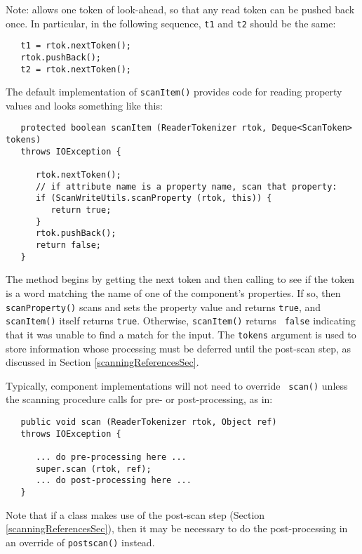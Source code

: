 \documentclass{article}
\begin{document}
\begin{sideblock}
Note:  allows one
token of look-ahead, so that any read token can be pushed
back once. In particular, in the following sequence,
{\tt t1} and {\tt t2} should be the same:
\begin{verbatim}
   t1 = rtok.nextToken();
   rtok.pushBack();
   t2 = rtok.nextToken();
\end{verbatim}
\end{sideblock}

The default implementation of {\tt scanItem()} provides
code for reading property values and looks something like this:
\begin{lstlisting}
   protected boolean scanItem (ReaderTokenizer rtok, Deque<ScanToken> tokens)
   throws IOException {

      rtok.nextToken();
      // if attribute name is a property name, scan that property:
      if (ScanWriteUtils.scanProperty (rtok, this)) {
         return true;
      }
      rtok.pushBack();
      return false;
   }
\end{lstlisting}
The method begins by getting the next token and then calling
to see if the token is a word matching the name of one of the
component's properties. If so, then {\tt scanProperty()} scans and
sets the property value and returns {\tt true}, and {\tt scanItem()}
itself returns {\tt true}. Otherwise, {\tt scanItem()} returns {\tt
false} indicating that it was unable to find a match for the input.
The {\tt tokens} argument is used to store information whose
processing must be deferred until the post-scan step, as discussed in
Section \ref{scanningReferencesSec}.

Typically, component implementations will not need to override {\tt
scan()} unless the scanning procedure calls for pre- or
post-processing, as in:
\begin{lstlisting}
   public void scan (ReaderTokenizer rtok, Object ref) 
   throws IOException {

      ... do pre-processing here ...
      super.scan (rtok, ref);
      ... do post-processing here ...
   }   
\end{lstlisting}
Note that if a class makes use of the post-scan step (Section
\ref{scanningReferencesSec}), then it may be necessary to do the
post-processing in an override of {\tt postscan()} instead.
\end{document}
